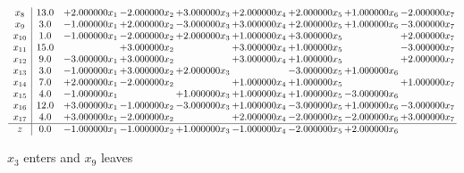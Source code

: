 \documentclass[10pt]{article}
\begin{document}
\[\begin{array}{c| c c@{\hskip 2pt} c@{\hskip 2pt} c@{\hskip 2pt} c@{\hskip 2pt} c@{\hskip 2pt} c@{\hskip 2pt} c@{\hskip 2pt} }
 x_{8}   &  13.0 & + 2.000000 x_{1} & -2.000000 x_{2} & + 3.000000 x_{3} & + 2.000000 x_{4} & + 2.000000 x_{5} & + 1.000000 x_{6} & -2.000000 x_{7}\\
 x_{9}   &  3.0 & -1.000000 x_{1} & + 2.000000 x_{2} & -3.000000 x_{3} & + 3.000000 x_{4} & + 2.000000 x_{5} & + 1.000000 x_{6} & -3.000000 x_{7}\\
 x_{10}   &  1.0 & -1.000000 x_{1} & -2.000000 x_{2} & + 2.000000 x_{3} & + 1.000000 x_{4} & + 3.000000 x_{5} &   & + 2.000000 x_{7}\\
 x_{11}   &  15.0  &   & + 3.000000 x_{2} &   & + 3.000000 x_{4} & + 1.000000 x_{5} &   & -3.000000 x_{7}\\
 x_{12}   &  9.0 & -3.000000 x_{1} & + 3.000000 x_{2} &   & + 3.000000 x_{4} & + 1.000000 x_{5} &   & + 2.000000 x_{7}\\
 x_{13}   &  3.0 & -1.000000 x_{1} & + 3.000000 x_{2} & + 2.000000 x_{3} &   & -3.000000 x_{5} & + 1.000000 x_{6} &   \\
 x_{14}   &  7.0 & + 2.000000 x_{1} & -2.000000 x_{2} &   & + 1.000000 x_{4} & + 1.000000 x_{5} &   & + 1.000000 x_{7}\\
 x_{15}   &  4.0 & -1.000000 x_{1} &   & + 1.000000 x_{3} & + 1.000000 x_{4} & + 1.000000 x_{5} & -3.000000 x_{6} &   \\
 x_{16}   &  12.0 & + 3.000000 x_{1} & -1.000000 x_{2} & -3.000000 x_{3} & + 1.000000 x_{4} & -3.000000 x_{5} & + 1.000000 x_{6} & -3.000000 x_{7}\\
 x_{17}   &  4.0 & + 3.000000 x_{1} & -2.000000 x_{2} &   & + 2.000000 x_{4} & -2.000000 x_{5} & -2.000000 x_{6} & + 3.000000 x_{7}\\
\hline
z    &  0.0 & -1.000000 x_{1} & -1.000000 x_{2} & + 1.000000 x_{3} & -1.000000 x_{4} & -2.000000 x_{5} & + 2.000000 x_{6} &   \\
\end{array}\]


 $ x_{3} $ enters and $ x_{9} $ leaves 
\end{document}
